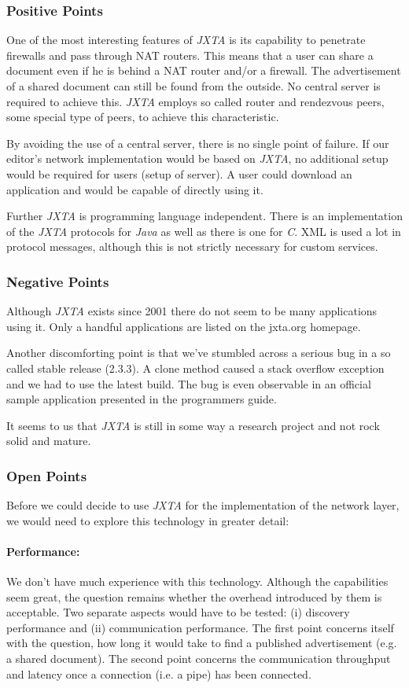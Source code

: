 \subsubsection{Positive Points}
One of the most interesting features of \emph{JXTA} is its capability to penetrate firewalls and pass through NAT routers. This means that a user can share a document even if he is behind a NAT router and/or a firewall. The advertisement of a shared document can still be found from the outside. No central server is required to achieve this. \emph{JXTA} employs so called router and rendezvous peers, some special type of peers, to achieve this characteristic.

By avoiding the use of a central server, there is no single point of failure. If our editor's network implementation would be based on \emph{JXTA}, no additional setup would be required for users (setup of server). A user could download an application and would be capable of directly using it.

Further \emph{JXTA} is programming language independent. There is an implementation of the \emph{JXTA} protocols for \emph{Java} as well as there is one for \emph{C}. XML is used a lot in protocol messages, although this is not strictly necessary for custom services.

\subsubsection{Negative Points}
Although \emph{JXTA} exists since 2001 there do not seem to be many applications using it. Only a handful applications are listed on the jxta.org homepage.

Another discomforting point is that we've stumbled across a serious bug in a so called stable release (2.3.3). A clone method caused a stack overflow exception and we had to use the latest build. The bug is even observable in an official sample application presented in the programmers guide.

It seems to us that \emph{JXTA} is still in some way a research project and not rock solid and mature.

\subsubsection{Open Points}
Before we could decide to use \emph{JXTA} for the implementation of the network layer, we would need to explore this technology in greater detail:

\paragraph{Performance:} We don't have much experience with this technology. Although the capabilities seem great, the question remains whether the overhead introduced by them is acceptable. Two separate aspects would have to be tested: (i) discovery performance and (ii) communication performance. The first point concerns itself with the question, how long it would take to find a published advertisement (e.g. a shared document). The second point concerns the communication throughput and latency once a connection (i.e. a pipe) has been connected.

